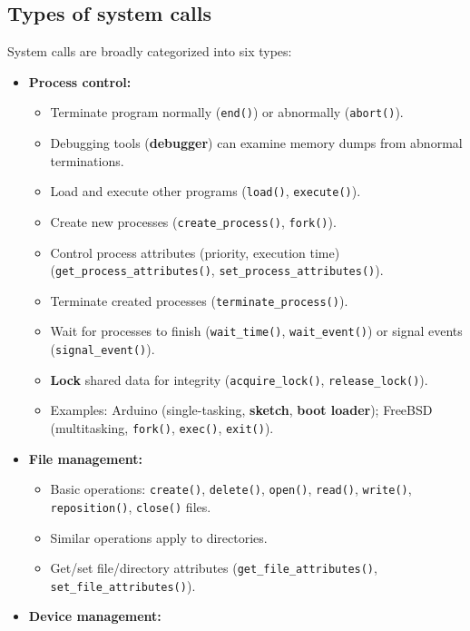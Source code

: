 \subsection*{Types of system calls}
System calls are broadly categorized into six types:
\begin{itemize}
    \item \textbf{Process control:}
    \begin{itemize}
        \item Terminate program normally (\texttt{end()}) or abnormally (\texttt{abort()}).
        \item Debugging tools (\textbf{debugger}) can examine memory dumps from abnormal terminations.
        \item Load and execute other programs (\texttt{load()}, \texttt{execute()}).
        \item Create new processes (\texttt{create\_process()}, \texttt{fork()}).
        \item Control process attributes (priority, execution time) (\texttt{get\_process\_attributes()}, \texttt{set\_process\_attributes()}).
        \item Terminate created processes (\texttt{terminate\_process()}).
        \item Wait for processes to finish (\texttt{wait\_time()}, \texttt{wait\_event()}) or signal events (\texttt{signal\_event()}).
        \item \textbf{Lock} shared data for integrity (\texttt{acquire\_lock()}, \texttt{release\_lock()}).
        \item Examples: Arduino (single-tasking, \textbf{sketch}, \textbf{boot loader}); FreeBSD (multitasking, \texttt{fork()}, \texttt{exec()}, \texttt{exit()}).
    \end{itemize}
    \item \textbf{File management:}
    \begin{itemize}
        \item Basic operations: \texttt{create()}, \texttt{delete()}, \texttt{open()}, \texttt{read()}, \texttt{write()}, \texttt{reposition()}, \texttt{close()} files.
        \item Similar operations apply to directories.
        \item Get/set file/directory attributes (\texttt{get\_file\_attributes()}, \texttt{set\_file\_attributes()}).
    \end{itemize}
    \item \textbf{Device management:}

\end{itemize}
